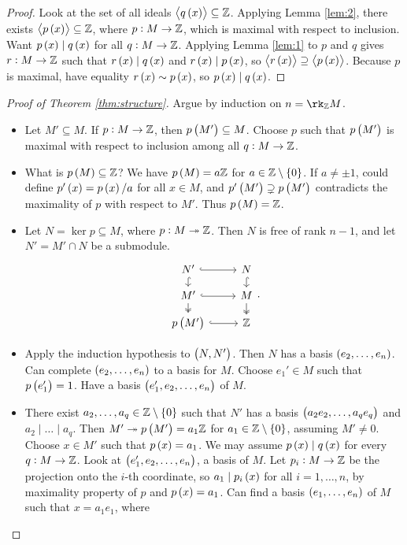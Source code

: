 \pagebreak

\begin{proof}
Look at the set of all ideals $ \abr{q\br{x}} \subseteq \ZZ $. Applying Lemma \ref{lem:2}, there exists $ \abr{p\br{x}} \subseteq \ZZ $, where $ p : M \to \mathbb{Z} $, which is maximal with respect to inclusion. Want $ p\br{x} \mid q\br{x} $ for all $ q : M \to \mathbb{Z} $. Applying Lemma \ref{lem:1} to $ p $ and $ q $ gives $ r : M \to \mathbb{Z} $ such that $ r\br{x} \mid q\br{x} $ and $ r\br{x} \mid p\br{x} $, so $ \abr{r\br{x}} \supseteq \abr{p\br{x}} $. Because $ p $ is maximal, have equality $ r\br{x} \sim p\br{x} $, so $ p\br{x} \mid q\br{x} $.
\end{proof}

\begin{proof}[Proof of Theorem \ref{thm:structure}]
Argue by induction on $ n = \rk_\ZZ M $.
\begin{itemize}
\item Let $ M' \subseteq M $. If $ p : M \to \mathbb{Z} $, then $ p\br{M'} \subseteq M $. Choose $ p $ such that $ p\br{M'} $ is maximal with respect to inclusion among all $ q : M \to \mathbb{Z} $.
\item What is $ p\br{M} \subseteq \ZZ $? We have $ p\br{M} = a\ZZ $ for $ a \in \ZZ \setminus \cbr{0} $. If $ a \ne \pm 1 $, could define $ p'\br{x} = p\br{x} / a $ for all $ x \in M $, and $ p'\br{M'} \supsetneq p\br{M'} $ contradicts the maximality of $ p $ with respect to $ M' $. Thus $ p\br{M} = \ZZ $.
\item Let $ N = \ker p \subseteq M $, where $ p : M \twoheadrightarrow \mathbb{Z} $. Then $ N $ is free of rank $ n - 1 $, and let $ N' = M' \cap N $ be a submodule.
$$
\begin{tikzcd}[row sep=small]
N' \arrow[hookrightarrow]{r} \arrow[hookrightarrow]{d} & N \arrow[hookrightarrow]{d} \\
M' \arrow[hookrightarrow]{r} \arrow[twoheadrightarrow]{d} & M \arrow[twoheadrightarrow]{d} \\
p\br{M'} \arrow[hookrightarrow]{r} & \ZZ
\end{tikzcd}.
$$
\item Apply the induction hypothesis to $ \br{N, N'} $. Then $ N $ has a basis $ \br{e_2, \dots, e_n} $. Can complete $ \br{e_2, \dots, e_n} $ to a basis for $ M $. Choose $ e_1' \in M $ such that $ p\br{e_1'} = 1 $. Have a basis $ \br{e_1', e_2, \dots, e_n} $ of $ M $.
\item There exist $ a_2, \dots, a_q \in \ZZ \setminus \cbr{0} $ such that $ N' $ has a basis $ \br{a_2e_2, \dots, a_qe_q} $ and $ a_2 \mid \dots \mid a_q $. Then $ M' \twoheadrightarrow p\br{M'} = a_1\ZZ $ for $ a_1 \in \ZZ \setminus \cbr{0} $, assuming $ M' \ne 0 $. Choose $ x \in M' $ such that $ p\br{x} = a_1 $. We may assume $ p\br{x} \mid q\br{x} $ for every $ q : M \to \mathbb{Z} $. Look at $ \br{e_1', e_2, \dots, e_n} $, a basis of $ M $. Let $ p_i : M \to \mathbb{Z} $ be the projection onto the $ i $-th coordinate, so $ a_1 \mid p_i\br{x} $ for all $ i = 1, \dots, n $, by maximality property of $ p $ and $ p\br{x} = a_1 $. Can find a basis $ \br{e_1, \dots, e_n} $ of $ M $ such that $ x = a_1e_1 $, where

\end{itemize}
\end{proof}

